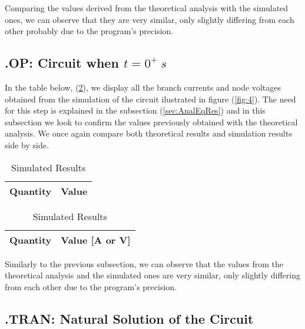 Comparing the values derived from the theoretical analysis with the simulated ones, we
can observe that they are very similar, only slightly differing from each other probably
due to the program's precision.


\subsection{.OP: Circuit when $t = 0^{+} \:s$}

In the table below, (\ref{tab:SimEqRes}), we display all the branch currents and
node voltages obtained from the simulation of the circuit ilustrated in figure (\ref{fig:4}).
The need for this step is explained in the subsection (\ref{sec:AnalEqRes}) and in this subsection
we look to confirm the values previously obtained with the theoretical analysis. We once again compare both 
theoretical results and simulation results side by side.

\begin{table}[H]
    \caption{Nodal Method Analysis - $t = 0^{+} \: s$}
    \begin{minipage}{.5\linewidth}

        \centering
        \caption{Theoretical Results}
        \begin{tabular}{|l|r|}
            \hline    
            {\bf Quantity} & {\bf Value} \\ \hline
            
        \end{tabular}

    \end{minipage}%
    \begin{minipage}{.5\linewidth}

        \centering
        \caption{Simulated Results}
        \begin{tabular}{|l|r|}
            \hline
            {\bf Quantity} & {\bf Value [A or V]} \\ \hline
            
        \end{tabular}

    \end{minipage}
    \label{tab:SimEqRes}
\end{table}

Similarly to the previous subsection, we can observe that the values from the theoretical analysis
and the simulated ones are very similar, only slightly differing from each other due to the
program's precision.


\subsection{.TRAN: Natural Solution of the Circuit}

